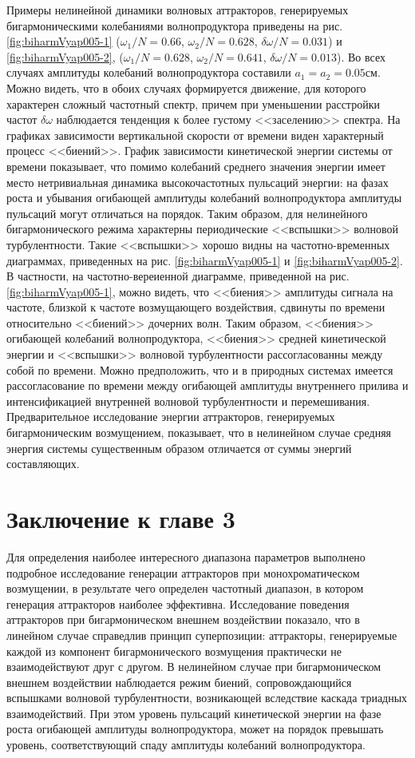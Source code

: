 Примеры нелинейной динамики волновых аттракторов, генерируемых бигармоническими колебаниями волнопродуктора приведены на рис. \ref{fig:biharmVyap005-1} %
($\omega_1/N=0.66$, $\omega_2/N=0.628$, $\delta \omega/N=0.031$) и \ref{fig:biharmVyap005-2}, 
($\omega_1/N=0.628$, $\omega_2/N=0.641$, $\delta \omega/N=0.013$). Во всех случаях амплитуды колебаний волнопродуктора составили $a_{1}=a_{2}=0.05$см. Можно видеть, что в обоих случаях формируется движение, для которого характерен сложный частотный спектр, причем при уменьшении расстройки частот $\delta \omega$ наблюдается тенденция к более густому <<заселению>> спектра.  На графиках зависимости вертикальной скорости от времени виден характерный процесс <<биений>>. График зависимости кинетической энергии системы от времени показывает, что помимо колебаний среднего значения энергии имеет место нетривиальная динамика высокочастотных пульсаций энергии: на фазах роста и убывания огибающей амплитуды колебаний волнопродуктора амплитуды пульсаций могут отличаться на порядок. Таким образом, для нелинейного бигармонического режима характерны периодические <<вспышки>> волновой турбулентности. Такие <<вспышки>> хорошо видны на частотно-временных диаграммах, приведенных на рис.  \ref{fig:biharmVyap005-1} и \ref{fig:biharmVyap005-2}. В частности, на частотно-вереиенной диаграмме, приведенной на рис.  \ref{fig:biharmVyap005-1}, можно видеть, что <<биения>> амплитуды сигнала на частоте, близкой к частоте возмущающего воздействия, сдвинуты по времени относительно <<биений>> дочерних волн. Таким образом, <<биения>> огибающей колебаний волнопродуктора, <<биения>> средней кинетической энергии и <<вспышки>> волновой турбулентности рассогласованны между собой по времени. Можно предположить, что и в природных системах имеется рассогласование по времени между огибающей амплитуды внутреннего прилива и интенсификацией внутренней волновой турбулентности и перемешивания. Предварительное исследование энергии аттракторов, генерируемых бигармоническим возмущением, показывает, что в нелинейном случае средняя энергия системы существенным образом отличается от суммы энергий составляющих.  

\section*{Заключение к главе 3}

Для определения наиболее интересного диапазона параметров выполнено подробное исследование генерации аттракторов при монохроматическом возмущении, в результате чего определен частотный диапазон, в котором генерация аттракторов наиболее эффективна. Исследование поведения аттракторов при бигармоническом внешнем воздействии показало, что в линейном случае справедлив принцип суперпозиции: аттракторы, генерируемые каждой из компонент бигармонического возмущения практически не взаимодействуют друг с другом. В нелинейном случае при бигармоническом внешнем воздействии наблюдается режим биений, сопровождающийся вспышками волновой турбулентности, возникающей вследствие каскада триадных взаимодействий. При этом уровень пульсаций кинетической энергии на фазе роста огибающей амплитуды волнопродуктора, может на порядок превышать уровень, соответствующий спаду амплитуды колебаний волнопродуктора. 